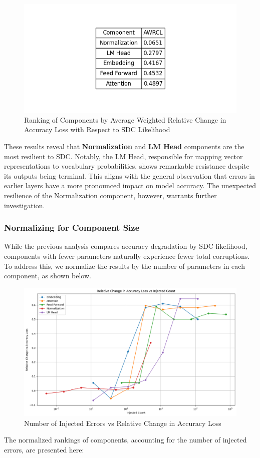 \begin{figure}[!htbp]
    \centering
    \includegraphics[width=1\linewidth]{images/comp-ranking.png}
    \caption{Ranking of Components by Average Weighted Relative Change in Accuracy Loss with Respect to SDC Likelihood}
    \label{fig:enter-label}
\end{figure}
These results reveal that \textbf{Normalization} and \textbf{LM Head} components are the most resilient to SDC. Notably, the LM Head, responsible for mapping vector representations to vocabulary probabilities, shows remarkable resistance despite its outputs being terminal. This aligns with the general observation that errors in earlier layers have a more pronounced impact on model accuracy. The unexpected resilience of the Normalization component, however, warrants further investigation.

\subsubsection{Normalizing for Component Size}

While the previous analysis compares accuracy degradation by SDC likelihood, components with fewer parameters naturally experience fewer total corruptions. To address this, we normalize the results by the number of parameters in each component, as shown below.

\begin{figure}[!htbp]
    \centering
    \includegraphics[width=1\linewidth]{images/norm-rel-acc-loss.png}
    \caption{Number of Injected Errors vs Relative Change in Accuracy Loss}
    \label{fig:enter-label}
\end{figure}
The normalized rankings of components, accounting for the number of injected errors, are presented here:

